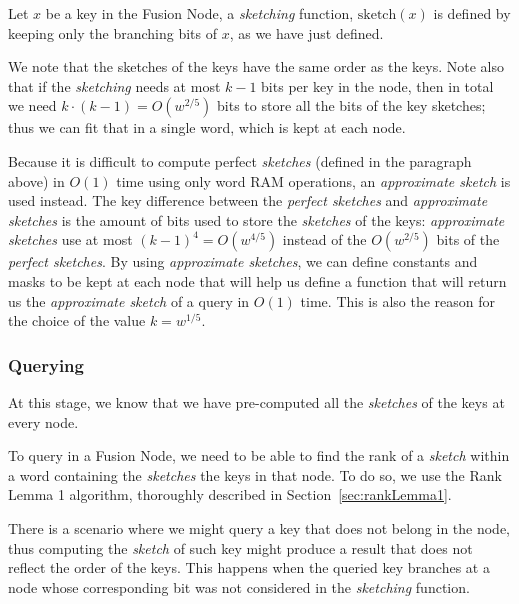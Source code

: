 Let $x$ be a key in the Fusion Node, a \textit{sketching} function, $\text{sketch}(x)$ is defined by keeping only the branching bits of $x$, as we have just defined.

We note that the sketches of the keys have the same order as the keys.
Note also that if the \textit{sketching} needs at most $k - 1$ bits per key in the node, then in total we need $k \cdot (k - 1) = O(w^{2/5})$ bits to store all the bits of the key sketches; thus we can fit that in a single word, which is kept at each node.

Because it is difficult to compute perfect \textit{sketches} (defined in the paragraph above) in $O(1)$ time using only word RAM operations, an \textit{approximate sketch} is used instead.
The key difference between the \textit{perfect sketches} and \textit{approximate sketches} is the amount of bits used to store the \textit{sketches} of the keys: \textit{approximate sketches} use at most $(k - 1)^4 = O(w^{4/5})$ instead of the  $O(w^{2/5})$ bits of the \textit{perfect sketches}.
By using \textit{approximate sketches}, we can define constants and masks to be kept at each node that will help us define a function that will return us the \textit{approximate sketch} of a query in $O(1)$ time.
This is also the reason for the choice of the value $k = w^{1/5}$.

\subsubsection{Querying} \label{sec:fusionTreeQuerying}

At this stage, we know that we have pre-computed all the \textit{sketches} of the keys at every node.

To query in a Fusion Node, we need to be able to find the rank of a \textit{sketch} within a word containing the \textit{sketches} the keys in that node.
To do so, we use the Rank Lemma 1 algorithm, thoroughly described in Section~\ref{sec:rankLemma1}.

There is a scenario where we might query a key that does not belong in the node, thus computing the \textit{sketch} of such key might produce a result that does not reflect the order of the keys.
This happens when the queried key branches at a node whose corresponding bit was not considered in the \textit{sketching} function.

